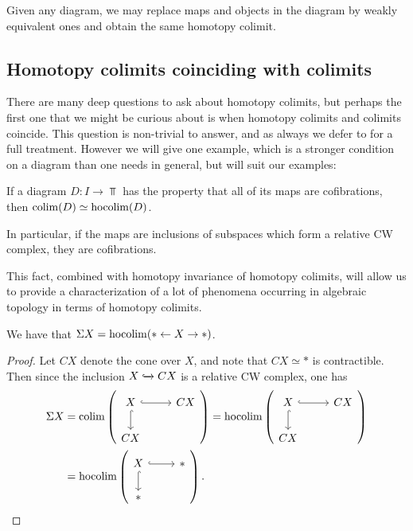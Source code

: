 \begin{corollary} Given any diagram, we may replace maps and objects in the diagram by weakly equivalent ones and obtain the same homotopy colimit.
\end{corollary}


\subsection{Homotopy colimits coinciding with colimits}

There are many deep questions to ask about homotopy colimits, but perhaps the first one that we might be curious about is when homotopy colimits and colimits coincide. This question is non-trivial to answer, and as always we defer to \cite{Dugger} for a full treatment. However we will give one example, which is a stronger condition on a diagram than one needs in general, but will suit our examples:

\begin{proposition} If a diagram $D: I \to \Top$ has the property that all of its maps are cofibrations, then $\mathop{\operatorname*{colim}}(D) \simeq \mathop{\operatorname*{hocolim}}(D)$.
\end{proposition}

In particular, if the maps are inclusions of subspaces which form a relative CW complex, they are cofibrations.

This fact, combined with homotopy invariance of homotopy colimits, will allow us to provide a characterization of a lot of phenomena occurring in algebraic topology in terms of homotopy colimits.

\begin{example} We have that $\Sigma X = \mathop{\operatorname*{hocolim}}(\ast \leftarrow X \to \ast)$.
\end{example}
\begin{proof} Let $CX$ denote the cone over $X$, and note that $CX \simeq \ast$ is contractible. Then since the inclusion $X \xhookrightarrow{} CX$ is a relative CW complex, one has
\begin{align*}
    \Sigma X &= \colim \left( \begin{tikzcd}[ampersand replacement=\&] X\rar[hook]\dar[hook] \& CX \\ CX \& \end{tikzcd} \right) = \hocolim \left( \begin{tikzcd}[ampersand replacement=\&] X\rar[hook]\dar[hook] \& CX \\ CX \& \end{tikzcd} \right) \\
    &=\hocolim \left( \begin{tikzcd}[ampersand replacement=\&] X\rar[hook]\dar[hook] \& \ast \\ \ast \& \end{tikzcd} \right).
\end{align*}
\end{proof}

